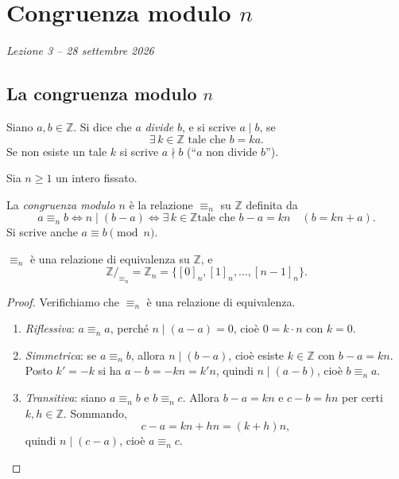 \documentclass[11pt,a4paper]{article}
\begin{document}
\section[Congruenza modulo $n$ (Lezione 3 -- 28 settembre 2026)]{Congruenza modulo $n$}
\noindent\emph{Lezione 3 -- 28 settembre 2026}
\subsection{La congruenza modulo $n$}

\begin{definizione}
Siano $a, b \in \mathbb{Z}$. Si dice che $a$ \emph{divide} $b$, e si scrive
$a \mid b$, se
\[
\exists\, k \in \mathbb{Z} \text{ tale che } b = ka.
\]
Se non esiste un tale $k$ si scrive $a \nmid b$ (``$a$ non divide $b$'').
\end{definizione}

Sia $n \geq 1$ un intero fissato.

\begin{definizione}
La \emph{congruenza modulo $n$} è la relazione $\equiv_n$ su $\mathbb{Z}$
definita da
\[
a \equiv_n b \iff n \mid (b - a) \iff \exists\, k \in \mathbb{Z} \text{
tale che } b - a = kn \quad (b = kn + a).
\]
Si scrive anche $a \equiv b \pmod n$.
\end{definizione}

\begin{proposizione}
$\equiv_n$ è una relazione di equivalenza su $\mathbb{Z}$, e
\[
\mathbb{Z}/_{\equiv_n} = \mathbb{Z}_n = \{[0]_n, [1]_n, \dots, [n-1]_n\}.
\]
\end{proposizione}

\begin{proof}
Verifichiamo che $\equiv_n$ è una relazione di equivalenza.
\begin{enumerate}
    \item \emph{Riflessiva}: $a \equiv_n a$, perché $n \mid (a - a) = 0$,
          cioè $0 = k \cdot n$ con $k = 0$.
    \item \emph{Simmetrica}: se $a \equiv_n b$, allora $n \mid (b - a)$,
          cioè esiste $k \in \mathbb{Z}$ con $b - a = kn$. Posto
          $k' = -k$ si ha $a - b = -kn = k'n$, quindi $n \mid (a - b)$,
          cioè $b \equiv_n a$.
    \item \emph{Transitiva}: siano $a \equiv_n b$ e $b \equiv_n c$.
          Allora $b - a = kn$ e $c - b = hn$ per certi $k, h \in
          \mathbb{Z}$. Sommando,
          \[
          c - a = kn + hn = (k + h)n,
          \]
          quindi $n \mid (c - a)$, cioè $a \equiv_n c$. \qedhere
\end{enumerate}
\end{proof}
\end{document}
